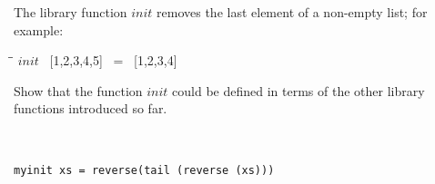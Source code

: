 \documentclass{article}
\begin{document}
\begin{exercise} 
The library function ${init}$ removes the last element of a non-empty list; for example:\\
\begin{tabbing}
	\=\hspace{2em}\=\kill
	\>\> $init$ \ [1,2,3,4,5] \ = \ [1,2,3,4] \\
\end{tabbing}
Show that the function $init$ could be defined in terms of the other library functions introduced so far. 
\end{exercise} \\
\begin{solution}
\begin{lstlisting}
myinit xs = reverse(tail (reverse (xs)))
\end{lstlisting}
\end{solution}
\end{document}
